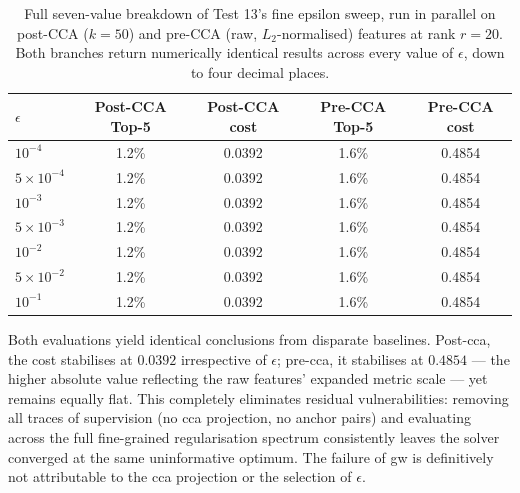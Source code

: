 \begin{table}[htpb]
\centering
\small
\begin{tabular}{lcccc}
\toprule
\textbf{$\epsilon$} & \textbf{Post-CCA Top-5} & \textbf{Post-CCA cost} & \textbf{Pre-CCA Top-5} & \textbf{Pre-CCA cost} \\
\midrule
$10^{-4}$          & 1.2\% & 0.0392 & 1.6\% & 0.4854 \\
$5{\times}10^{-4}$ & 1.2\% & 0.0392 & 1.6\% & 0.4854 \\
$10^{-3}$          & 1.2\% & 0.0392 & 1.6\% & 0.4854 \\
$5{\times}10^{-3}$ & 1.2\% & 0.0392 & 1.6\% & 0.4854 \\
$10^{-2}$          & 1.2\% & 0.0392 & 1.6\% & 0.4854 \\
$5{\times}10^{-2}$ & 1.2\% & 0.0392 & 1.6\% & 0.4854 \\
$10^{-1}$          & 1.2\% & 0.0392 & 1.6\% & 0.4854 \\
\bottomrule
\end{tabular}
\caption{Full seven-value breakdown of Test 13's fine epsilon sweep, run
in parallel on post-CCA ($k=50$) and pre-CCA (raw, $L_2$-normalised)
features at rank $r=20$. Both branches return numerically identical
results across every value of $\epsilon$, down to four decimal places.}
\label{tab:eps_low_full}
\end{table}

Both evaluations yield identical conclusions from disparate baselines. Post-\gls{cca}, the cost stabilises at $0.0392$ irrespective of $\epsilon$; pre-\gls{cca}, it stabilises at $0.4854$ --- the higher absolute value reflecting the raw features' expanded metric scale --- yet remains equally flat. This completely eliminates residual vulnerabilities: removing all traces of supervision (no \gls{cca} projection, no anchor pairs) and evaluating across the full fine-grained regularisation spectrum consistently leaves the solver converged at the same uninformative optimum. The failure of \gls{gw} is definitively not attributable to the \gls{cca} projection or the selection of $\epsilon$.

